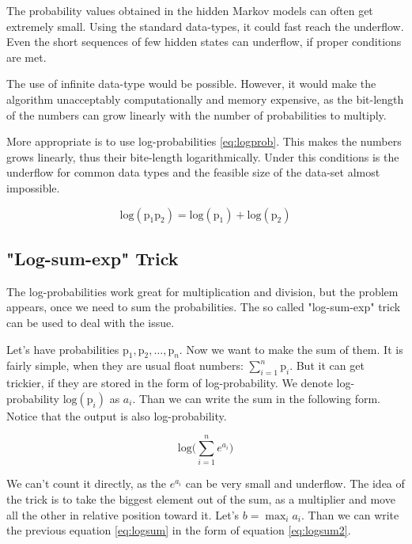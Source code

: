 \documentclass[thesis=M,english]{FITthesis}[2012/10/20]
\begin{document}
The probability values obtained in the hidden Markov models can often get extremely small. Using the standard data-types, it could fast reach the underflow. Even the short sequences of few hidden states can underflow, if proper conditions are met. 

The use of infinite data-type would be possible. However, it would make the algorithm unacceptably computationally and memory expensive, as the bit-length of the numbers can grow linearly with the number of probabilities to multiply.

More appropriate is to use log-probabilities \eqref{eq:logprob}. This makes the numbers grows linearly, thus their bite-length logarithmically. Under this conditions is the underflow for common data types and the feasible size of the data-set almost impossible.

\begin{equation}\label{eq:logprob}
\mathrm{log}(\mathrm{p}_1\mathrm{p}_2) = \mathrm{log}(\mathrm{p}_1) + \mathrm{log}(\mathrm{p}_2)
\end{equation}   

\subsection{"Log-sum-exp" Trick}

The log-probabilities work great for multiplication and division, but the problem appears, once we need to sum the probabilities. The so called "log-sum-exp" trick can be used to deal with the issue. 

Let's have probabilities $ \mathrm{p}_1, \mathrm{p}_2, \dots ,\mathrm{p}_n $. Now we want to make the sum of them. It is fairly simple, when they are usual float numbers: $\sum_{i=1}^n \mathrm{p}_i$. But it can get trickier, if they are stored in the form of log-probability. We denote log-probability $\mathrm{log}( \mathrm{p}_i )$ as $a_i$. Than we can write the sum in the following form. Notice that the output is also log-probability.

\begin{equation}\label{eq:logsum}
\mathrm{log} \big( \sum_{i=1}^n e^{a_i} \big)
\end{equation}

We can't count it directly, as the $e^{a_i}$ can be very small and underflow. The idea of the trick is to take the biggest element out of the sum, as a multiplier and move all the other in relative position toward it.
Let's $b = \max_{i} a_i$. Than we can write the previous equation \eqref{eq:logsum} in the form of equation \eqref{eq:logsum2}. 
\end{document}
